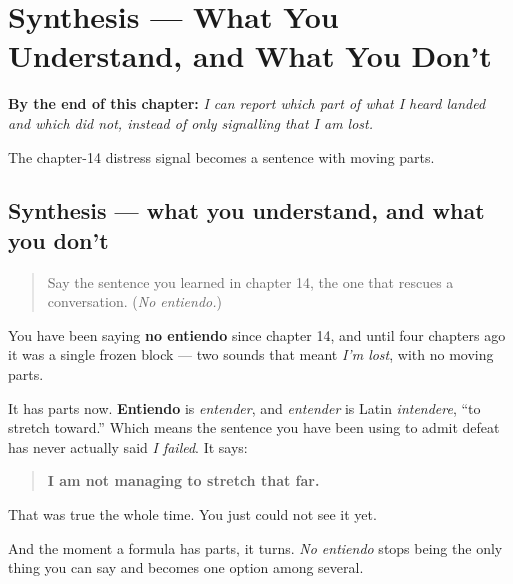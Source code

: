 
\chapter{Synthesis --- What You Understand, and What You Don't}
\label{ch:spanish-synthesis-verbs-of-mind}

\begin{chapteropening}
\textbf{By the end of this chapter:} \emph{I can report which part of what I heard landed and which did not, instead of only signalling that I am lost.}

The chapter-14 distress signal becomes a sentence with moving parts.
\end{chapteropening}

\section[Practice]{Synthesis — what you understand, and what you don't}

\label{lesson:ES-C34-sintesis-mente}



\begin{quote}
Say the sentence you learned in chapter 14, the one that rescues a conversation. (\emph{No entiendo.})
\end{quote}

\begin{grammarlens}[title={Grammar Lens: the formula was a verb all along}]
You have been saying \textbf{no entiendo} since chapter 14, and until four chapters ago it was a single frozen block — two sounds that meant \emph{I'm lost}, with no moving parts.

It has parts now. \textbf{Entiendo} is \emph{entender}, and \emph{entender} is Latin \emph{intendere}, \textquotedblleft{}to stretch toward.\textquotedblright{} Which means the sentence you have been using to admit defeat has never actually said \emph{I failed}. It says:

\begin{quote}
\textbf{I am not managing to stretch that far.}
\end{quote}

That was true the whole time. You just could not see it yet.

And the moment a formula has parts, it turns. \emph{No entiendo} stops being the only thing you can say and becomes one option among several.
\end{grammarlens}

